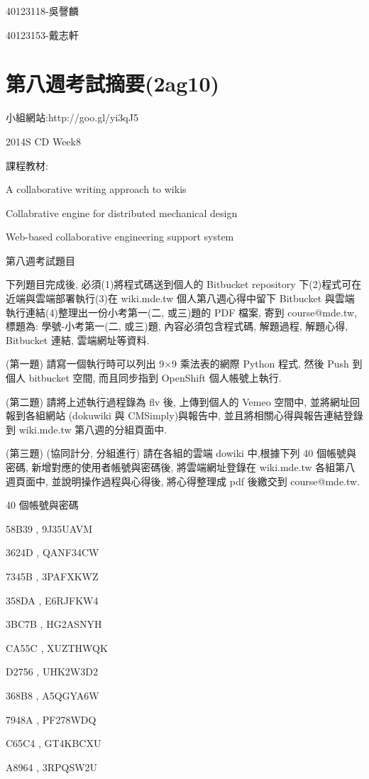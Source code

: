 \documentclass[]{article}
\begin{document}
40123118-吳謦麟

40123153-戴志軒

\section{第八週考試摘要(2ag10)}\label{ux7b2cux516bux9031ux8003ux8a66ux6458ux89812ag10}

小組網站:http://goo.gl/yi3qJ5

2014S CD Week8

課程教材:

A collaborative writing approach to wikis

Collabrative engine for distributed mechanical design

Web-based collaborative engineering support system

第八週考試題目

下列題目完成後, 必須(1)將程式碼送到個人的 Bitbucket repository
下(2)程式可在近端與雲端部署執行(3)在 wiki.mde.tw 個人第八週心得中留下
Bitbucket 與雲端執行連結(4)整理出一份小考第一(二, 或三)題的 PDF 檔案,
寄到 course@mde.tw, 標題為: 學號-小考第一(二, 或三)題,
內容必須包含程式碼, 解題過程, 解題心得, Bitbucket 連結, 雲端網址等資料.

(第一題) 請寫一個執行時可以列出 9×9 乘法表的網際 Python 程式, 然後 Push
到個人 bitbucket 空間, 而且同步指到 OpenShift 個人帳號上執行.

(第二題) 請將上述執行過程錄為 flv 後, 上傳到個人的 Vemeo 空間中,
並將網址回報到各組網站 (dokuwiki 與 CMSimply)與報告中,
並且將相關心得與報告連結登錄到 wiki.mde.tw 第八週的分組頁面中.

(第三題) (協同計分, 分組進行) 請在各組的雲端 dowiki 中,根據下列 40
個帳號與密碼, 新增對應的使用者帳號與密碼後, 將雲端網址登錄在 wiki.mde.tw
各組第八週頁面中, 並說明操作過程與心得後, 將心得整理成 pdf 後繳交到
course@mde.tw.

40 個帳號與密碼

58B39 , 9J35UAVM

3624D , QANF34CW

7345B , 3PAFXKWZ

358DA , E6RJFKW4

3BC7B , HG2ASNYH

CA55C , XUZTHWQK

D2756 , UHK2W3D2

368B8 , A5QGYA6W

7948A , PF278WDQ

C65C4 , GT4KBCXU

A8964 , 3RPQSW2U
\end{document}
